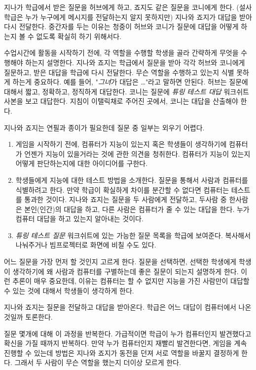 \documentclass[]{article}
\begin{document}
지나가 학급에서 받은 질문을 허브에게 하고, 죠지도 같은 질문을 코니에게
한다. (설사 학급은 누가 누구에게 메시지를 전달하는지 알지 못하지만)
지나와 죠지가 대답을 받아 다시 전달한다. 중간자를 두는 이유는 청중이
허브와 코니가 질문에 대답을 어떻게 하는지 볼 수 없도록 확실히 하기
위해서다.

수업시간에 활동을 시작하기 전에, 각 역할을 수행할 학생을 골라 간략하게
무엇을 수행해야 하는지 설명한다. 지나와 죠지는 학급에서 질문을 받아 각각
허브와 코니에게 질문하고, 받은 대답을 학급에 다시 전달한다. 무슨 역할을
수행하고 있는지 식별 못하게 하는게 중요하다. 예를 들어, "\emph{그녀}가
대답은 \ldots{}"라고 말하면 안된다. 허브는 질문에 대해서 짧고, 정확하고,
정직하게 대답한다. 코니는 질문에 \emph{튜링 테스트 대답} 워크쉬트 사본을
보고 대답한다. 지침이 이탤릭채로 주어진 곳에서, 코니는 대답을 산출해야
한다.

지나와 죠지는 연필과 종이가 필요한데 질문 중 일부는 외우기 어렵다.

\begin{enumerate}
\item
  게임을 시작하기 전에, 컴퓨터가 지능이 있는지 혹은 학생들이 생각하기에
  컴퓨터가 언젠가 지능이 있을거라는 것에 관한 의견을 청취한다. 컴퓨터가
  지능이 있는지 어떻게 판단하는지에 대한 아이디어를 구한다.
\item
  학생들에게 지능에 대한 테스트 방법을 소개한다. 질문을 통해서 사람과
  컴퓨터를 식별하려고 한다. 만약 학급이 확실하게 차이를 분간할 수 없다면
  컴퓨터는 테스트를 통과한 것이다. 지나와 죠지는 질문을 두 사람에게
  전달하고, 두사람 중 한사람은 본인(인간)의 대답을 하고, 다른 사람은
  컴퓨터가 줄 수 있는 대답을 한다. 누가 컴퓨터 대답을 하고 있는지
  알아내는 것이다.
\item
  \emph{튜링 테스트 질문} 워크쉬트에 있는 가능한 질문 목록을 학급에
  보여준다. 복사해서 나눠주거나 빔프로젝터로 화면에 비칠 수도 있다.
\end{enumerate}

어느 질문을 가장 먼저 할 것인지 고르게 한다. 질문을 선택하면, 선택한
학생에게 학생이 생각하기에 왜 사람과 컴퓨터를 구별하는데 좋은 질문이
되는지 설명하게 한다. 이런 추론이 매우 중요한데, 이유는 컴퓨터는 할 수
없지만 지능을 가진 사람만이 대답할 수 있는 것에 대해서 학생들이 생각하게
한다.

지나와 죠지는 질문을 전달하고 대답을 받아온다. 학급은 어느 대답이
컴퓨터에서 나온 것일까 토론한다.

질문 몇개에 대해 이 과정을 반복한다. 가급적이면 학급이 누가 컴퓨터인지
발견했다고 확신을 가질 때까지 반복하다. 만약 누가 컴퓨터인지 재빨리
발견한다면, 게임을 계속진행할 수 있는데 방법은 지나와 죠지가 동전을 던져
서로 역할을 바꿀지 결정하게 한다. 그래서 두 사람이 무슨 역할을 했는지
더이상 모르게 한다.
\end{document}
